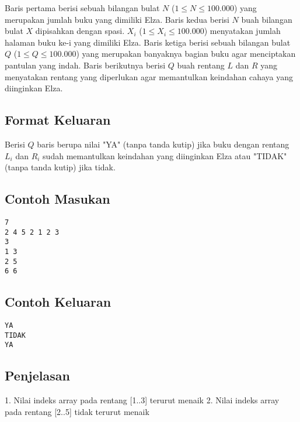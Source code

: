 \documentclass{article}
\begin{document}
Baris pertama berisi sebuah bilangan bulat $N$ ($1 \leq N \leq 100.000$) yang merupakan jumlah buku yang dimiliki Elza.
Baris kedua berisi $N$ buah bilangan bulat $X$ dipisahkan dengan spasi. $X_i$ ($1 \leq X_i \leq 100.000$) menyatakan jumlah halaman buku ke-i yang dimiliki Elza.
Baris ketiga berisi sebuah bilangan bulat $Q$ ($1 \leq Q \leq 100.000$) yang merupakan banyaknya bagian buku agar menciptakan pantulan yang indah.
Baris berikutnya berisi $Q$ buah rentang $L$ dan $R$ yang menyatakan rentang yang diperlukan agar memantulkan keindahan cahaya yang diinginkan Elza.

\subsection*{Format Keluaran}

Berisi $Q$ baris berupa nilai "YA" (tanpa tanda kutip) 
jika buku dengan rentang $L_i$ dan $R_i$ sudah memantulkan keindahan yang diinginkan Elza 
atau "TIDAK" (tanpa tanda kutip) jika tidak.
\\

\begin{multicols}{2}
\subsection*{Contoh Masukan}
\begin{lstlisting}
7
2 4 5 2 1 2 3
3
1 3
2 5
6 6
\end{lstlisting}
\columnbreak
\subsection*{Contoh Keluaran}
\begin{lstlisting}
YA
TIDAK
YA
\end{lstlisting}
\vfill
\null
\end{multicols}

\subsection*{Penjelasan}
1. Nilai indeks array pada rentang [1..3] terurut menaik
2. Nilai indeks array pada rentang [2..5] tidak terurut menaik

\pagebreak
\end{document}
